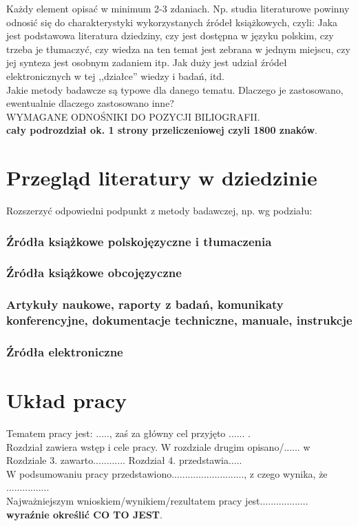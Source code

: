 \documentclass[12pt]{report}
\begin{document}
Każdy element opisać w minimum 2-3 zdaniach. Np. studia literaturowe powinny
odnosić się do charakterystyki wykorzystanych źródeł książkowych, czyli: Jaka
jest podstawowa literatura dziedziny, czy jest dostępna w języku polskim, czy trzeba je tłumaczyć, czy wiedza na ten
temat jest zebrana w jednym miejscu, czy jej synteza jest osobnym zadaniem itp. 
Jak duży jest udział źródeł elektronicznych w tej ,,działce'' wiedzy i badań,
itd. \\
\indent Jakie metody badawcze są typowe dla danego tematu. Dlaczego je
zastosowano, ewentualnie dlaczego zastosowano inne? \\
WYMAGANE ODNOŚNIKI DO POZYCJI BILIOGRAFII.\\
{\bf cały podrozdział ok. 1 strony przeliczeniowej czyli 1800 znaków}.

\section{Przegląd literatury w dziedzinie}
Rozszerzyć odpowiedni podpunkt z metody badawczej, np. wg podziału:
\subsubsection{Źródła książkowe polskojęzyczne i tłumaczenia}
\subsubsection{Źródła książkowe obcojęzyczne}
\subsubsection{Artykuły naukowe, raporty z badań, komunikaty konferencyjne,
dokumentacje techniczne, manuale, instrukcje}
\subsubsection{Źródła elektroniczne}


\section{Układ pracy}
Tematem pracy jest: ....., zaś za główny cel przyjęto ...... . \\
Rozdział \label{rozdz.wstep} zawiera wstęp i cele pracy. W rozdziale drugim
opisano/...... w Rozdziale 3. zawarto............ Rozdział 4. przedstawia..... \\
W podsumowaniu pracy przedstawiono..........................., z czego wynika,
że ................  \\
Najważniejszym wnioskiem/wynikiem/rezultatem pracy jest..................\\ {\bf wyraźnie określić
CO TO JEST}. \\
\end{document}
